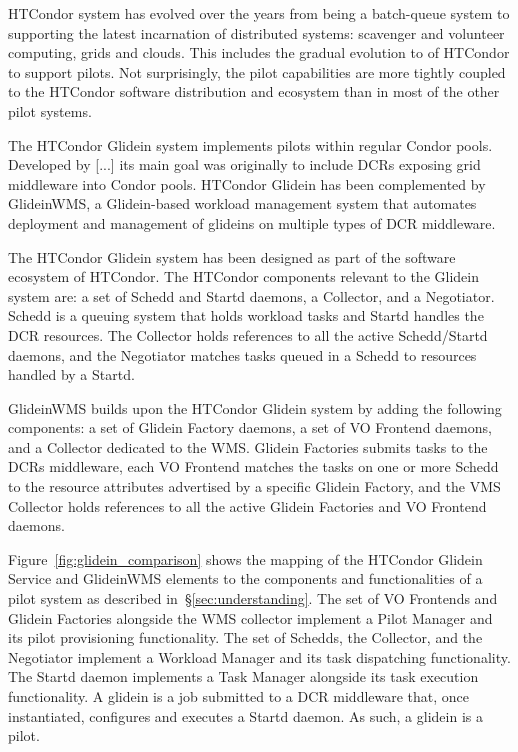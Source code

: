 \documentclass{sig-alternate}
\begin{document}
HTCondor system has evolved over the years from being a batch-queue system to
supporting the latest incarnation of distributed systems: scavenger and
volunteer computing, grids and clouds. This includes the gradual evolution to of
HTCondor to support pilots. Not surprisingly, the pilot capabilities are more
tightly coupled to the HTCondor software distribution and ecosystem than in most
of the other pilot systems.

The HTCondor Glidein system implements pilots within regular Condor pools.
Developed by [...] its main goal was originally to include DCRs exposing grid
middleware into Condor pools. HTCondor Glidein has been complemented by
GlideinWMS, a Glidein-based workload management system that automates deployment
and management of glideins on multiple types of DCR middleware.


The HTCondor Glidein system has been designed as part of the software ecosystem
of HTCondor. The HTCondor components relevant to the Glidein system are: a set
of Schedd and Startd daemons, a Collector, and a Negotiator. Schedd is a queuing
system that holds workload tasks and Startd handles the DCR resources. The
Collector holds references to all the active Schedd/Startd daemons, and the
Negotiator matches tasks queued in a Schedd to resources handled by a Startd.

GlideinWMS builds upon the HTCondor Glidein system by adding the following
components: a set of Glidein Factory daemons, a set of VO Frontend daemons, and
a Collector dedicated to the WMS. Glidein Factories submits tasks to the DCRs
middleware, each VO Frontend matches the tasks on one or more Schedd to the
resource attributes advertised by a specific Glidein Factory, and the VMS
Collector holds references to all the active Glidein Factories and VO Frontend
daemons.

Figure~\ref{fig:glidein_comparison} shows the mapping of the HTCondor Glidein
Service and GlideinWMS elements to the components and functionalities of a pilot
system as described in~\S\ref{sec:understanding}. The set of VO Frontends and
Glidein Factories alongside the WMS collector implement a Pilot Manager and its
pilot provisioning functionality. The set of Schedds, the Collector, and the
Negotiator implement a Workload Manager and its task dispatching functionality.
The Startd daemon implements a Task Manager alongside its task execution
functionality. A glidein is a job submitted to a DCR middleware that, once
instantiated, configures and executes a Startd daemon. As such, a glidein is a
pilot.
\end{document}
